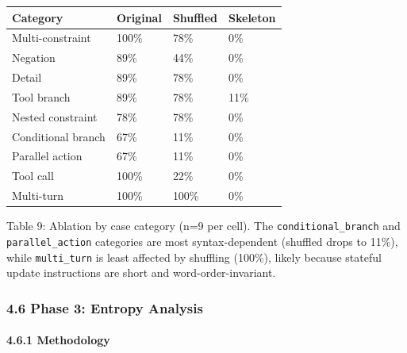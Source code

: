 {\def\LTcaptype{none} %

\begin{longtable}[]{@{}llll@{}}

\toprule\noalign{}

Category & Original & Shuffled & Skeleton \\

\midrule\noalign{}

\endhead

\bottomrule\noalign{}

\endlastfoot

Multi-constraint & 100\% & 78\% & 0\% \\

Negation & 89\% & 44\% & 0\% \\

Detail & 89\% & 78\% & 0\% \\

Tool branch & 89\% & 78\% & 11\% \\

Nested constraint & 78\% & 78\% & 0\% \\

Conditional branch & 67\% & 11\% & 0\% \\

Parallel action & 67\% & 11\% & 0\% \\

Tool call & 100\% & 22\% & 0\% \\

Multi-turn & 100\% & 100\% & 0\% \\

\end{longtable}

}



Table 9: Ablation by case category (n=9 per cell). The \texttt{conditional\_branch} and \texttt{parallel\_action} categories are most syntax-dependent (shuffled drops to 11\%), while \texttt{multi\_turn} is least affected by shuffling (100\%), likely because stateful update instructions are short and word-order-invariant.



\subsubsection{4.6 Phase 3: Entropy Analysis}\label{phase-3-entropy-analysis}



\paragraph{4.6.1 Methodology}\label{methodology}



